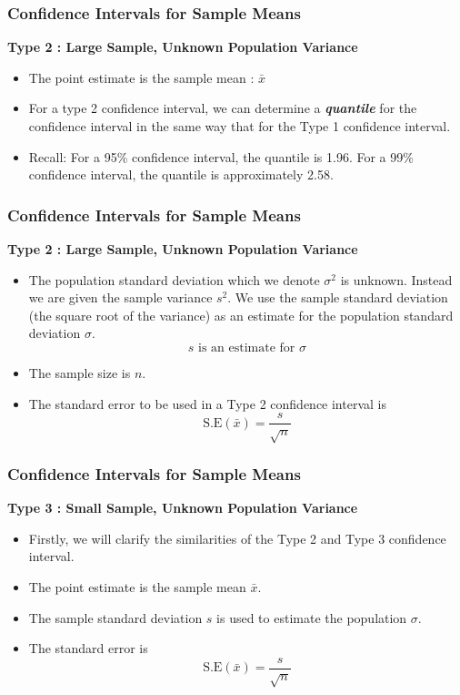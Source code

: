 \begin{frame}
\frametitle{Confidence Intervals for Sample Means}
\textbf{Type 2 : Large Sample, Unknown Population Variance}\\
\begin{itemize}

\item The point estimate is the sample mean : $\bar{x}$

\item For a type 2 confidence interval, we can determine a \textbf{\textit{quantile}} for the confidence interval in the same way that for the Type 1 confidence interval.

\item Recall: For a 95\% confidence interval, the quantile is 1.96. For a 99\% confidence interval, the quantile is approximately 2.58.

\end{itemize}
\end{frame}

\begin{frame}
\frametitle{Confidence Intervals for Sample Means}
\textbf{Type 2 : Large Sample, Unknown Population Variance}\\
\begin{itemize}
\item The population standard deviation which we denote $\sigma^2$ is unknown.
Instead we are given the sample variance $s^2$. We use the sample standard deviation (the square root of the variance) as an estimate for the population standard deviation $\sigma$.
\[ s \mbox{ is an estimate for } \sigma \]

\item The sample size is $n$.
\item The standard error to be used in a Type 2 confidence interval is
\[ \mbox{S.E}(\bar{x}) = \frac{s}{\sqrt{n}}\]

\end{itemize}
\end{frame}

\begin{frame}
\frametitle{Confidence Intervals for Sample Means}
\textbf{Type 3 : Small Sample, Unknown Population Variance}\\
\begin{itemize}
\item Firstly, we will clarify the similarities of the Type 2 and Type 3 confidence interval.
\item The point estimate is the sample mean $\bar{x}$.
\item The sample standard deviation $s$ is used to estimate the population $\sigma$.
\item The standard error is
\[ \mbox{S.E}(\bar{x}) = \frac{s}{\sqrt{n}}\]
\end{itemize}
\end{frame}

